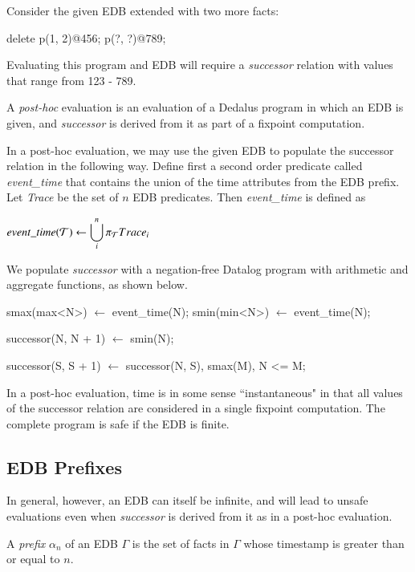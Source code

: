 Consider the given EDB extended with two more facts:

\begin{Dedalus}
delete p(1, 2)@456;
p(?, ?)@789;
\end{Dedalus}

Evaluating this program and EDB will require a \emph{successor} relation with values that range from 123 - 789.

\begin{definition}
A \emph{post-hoc} evaluation is an evaluation of a Dedalus program in which an EDB is given, and \emph{successor} is derived from it
as part of a fixpoint computation.
\end{definition}

In a post-hoc evaluation, we may use the given EDB to populate the successor relation in the following way.
Define first a second order predicate called \emph{event\_time}
that contains the union of the time attributes from the EDB prefix. Let \emph{Trace} be the set of $n$ EDB predicates.  
Then \emph{event\_time} is defined as

$event\_time(\Tau) \leftarrow \displaystyle\bigcup_{i}^n \pi_{\Tau}Trace_{i}$

We populate \emph{successor} with a negation-free Datalog program with arithmetic and aggregate functions, as shown below.

\begin{Dedalus}
smax(max<N>) \(\leftarrow\) event\_time(N);
smin(min<N>) \(\leftarrow\) event\_time(N);

successor(N, N + 1) \(\leftarrow\) smin(N);

successor(S, S + 1) \(\leftarrow\) 
    successor(N, S),
    smax(M),
    N <= M;
\end{Dedalus}

In a post-hoc evaluation, time is in some sense ``instantaneous" in that all values of the successor relation are considered in a single
fixpoint computation.  The complete program is safe if the EDB is finite.

\subsection{EDB Prefixes}

In general, however, an EDB can itself be infinite, and will lead to unsafe evaluations even when \emph{successor} is derived from it
as in a post-hoc evaluation.

\begin{definition}
A \emph{prefix} $\alpha_{n}$ of an EDB $\Gamma$ is the set of facts in $\Gamma$ whose timestamp is greater than or equal to $n$. 
\end{definition}

